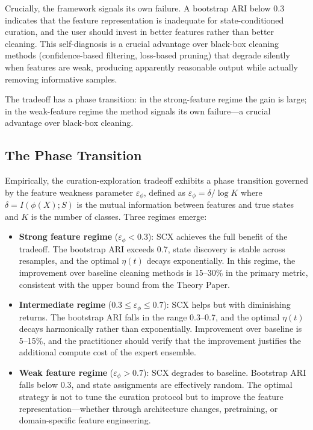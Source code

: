 \documentclass{article}
\begin{document}
Crucially, the framework signals its own failure. A bootstrap ARI below 0.3 indicates that the feature representation is inadequate for state-conditioned curation, and the user should invest in better features rather than better cleaning. This self-diagnosis is a crucial advantage over black-box cleaning methods (confidence-based filtering, loss-based pruning) that degrade silently when features are weak, producing apparently reasonable output while actually removing informative samples.

The tradeoff has a phase transition: in the strong-feature regime the gain is large; in the weak-feature regime the method signals its own failure---a crucial advantage over black-box cleaning.

\subsection{The Phase Transition}
\label{sec:phase}

Empirically, the curation-exploration tradeoff exhibits a phase transition governed by the feature weakness parameter $\varepsilon_\phi$, defined as $\varepsilon_\phi = \delta / \log K$ where $\delta = I(\phi(X); S)$ is the mutual information between features and true states and $K$ is the number of classes. Three regimes emerge:

\begin{itemize}
    \item \textbf{Strong feature regime} ($\varepsilon_\phi < 0.3$): SCX achieves the full benefit of the tradeoff. The bootstrap ARI exceeds 0.7, state discovery is stable across resamples, and the optimal $\eta(t)$ decays exponentially. In this regime, the improvement over baseline cleaning methods is 15--30\% in the primary metric, consistent with the upper bound from the Theory Paper.
    \item \textbf{Intermediate regime} ($0.3 \leq \varepsilon_\phi \leq 0.7$): SCX helps but with diminishing returns. The bootstrap ARI falls in the range 0.3--0.7, and the optimal $\eta(t)$ decays harmonically rather than exponentially. Improvement over baseline is 5--15\%, and the practitioner should verify that the improvement justifies the additional compute cost of the expert ensemble.
    \item \textbf{Weak feature regime} ($\varepsilon_\phi > 0.7$): SCX degrades to baseline. Bootstrap ARI falls below 0.3, and state assignments are effectively random. The optimal strategy is not to tune the curation protocol but to improve the feature representation---whether through architecture changes, pretraining, or domain-specific feature engineering.
\end{itemize}
\end{document}
